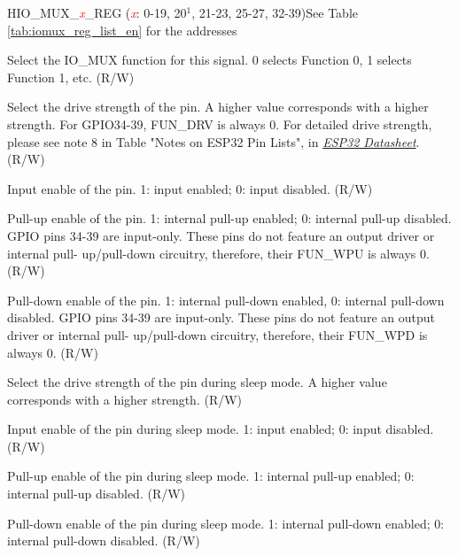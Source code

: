 \begin{register}{H}{IO\_MUX\_\textcolor{red}{\it{x}}\_REG (\textcolor{red}{\it{x}}: 0-19, 20$^1$, 21-23, 25-27, 32-39)}{See Table \ref{tab:iomux_reg_list_en} for the addresses}
%
%
%
%
%
%
%
%
%
%
%
%
\regnewline%
\begin{regdesc}\begin{reglist}
\item [MCU\_SEL]Select the IO\_MUX function for this signal. 0 selects Function 0, 1 selects Function 1, etc. (R/W)
\label{FUNDRV}\item [FUN\_DRV]Select the drive strength of the pin. A higher value corresponds with a higher strength. For GPIO34-39, FUN\_DRV is always 0. For detailed drive strength, please see note 8 in Table "Notes on ESP32 Pin Lists", in \href{https://www.espressif.com/sites/default/files/documentation/esp32_datasheet_en.pdf}{\it{ESP32 Datasheet}}.  (R/W)
\item [FUN\_IE]Input enable of the pin. 1: input enabled; 0: input disabled. (R/W)
\label{regdesc:FUNWPU} \item  [FUN\_WPU]Pull-up enable of the pin. 1: internal pull-up enabled; 0: internal pull-up disabled. GPIO pins 34-39 are input-only. These pins do not feature an output driver or internal pull- up/pull-down circuitry, therefore, their FUN\_WPU is always 0. (R/W)
\label{regdesc:FUNWPD} \item  [FUN\_WPD]Pull-down enable of the pin. 1: internal pull-down enabled, 0: internal pull-down disabled. GPIO pins 34-39 are input-only. These pins do not feature an output driver or internal pull- up/pull-down circuitry, therefore, their FUN\_WPD is always 0. (R/W)
\item [MCU\_DRV]Select the drive strength of the pin during sleep mode. A higher value corresponds with a higher strength. (R/W)
\item [MCU\_IE]Input enable of the pin during sleep mode. 1: input enabled; 0: input disabled. (R/W)
\item [MCU\_WPU]Pull-up enable of the pin during sleep mode. 1: internal pull-up enabled; 0: internal pull-up disabled. (R/W)
\item [MCU\_WPD]Pull-down enable of the pin during sleep mode. 1: internal pull-down enabled; 0: internal pull-down disabled. (R/W)

\end{reglist}
\end{regdesc}
\end{register}
